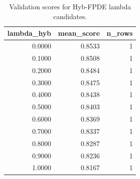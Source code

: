 \begin{table}[t]
\caption{Validation scores for Hyb-FPDE lambda candidates.}
\label{tab:lambda_distribution_computed}
\centering
\begin{tabular}{rrr}
\toprule
lambda\_hyb & mean\_score & n\_rows \\
\midrule
0.0000 & 0.8533 & 1 \\
0.1000 & 0.8508 & 1 \\
0.2000 & 0.8484 & 1 \\
0.3000 & 0.8475 & 1 \\
0.4000 & 0.8438 & 1 \\
0.5000 & 0.8403 & 1 \\
0.6000 & 0.8369 & 1 \\
0.7000 & 0.8337 & 1 \\
0.8000 & 0.8287 & 1 \\
0.9000 & 0.8236 & 1 \\
1.0000 & 0.8167 & 1 \\
\bottomrule
\end{tabular}

\end{table}
